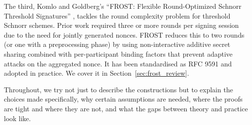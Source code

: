 The third, Komlo and Goldberg's ``FROST: Flexible Round-Optimized Schnorr Threshold
Signatures'' \cite{FROST20}, tackles the round complexity problem for threshold Schnorr
schemes. Prior work required three or more rounds per signing session due to the need
for jointly generated nonces. FROST reduces this to two rounds (or one with a
preprocessing phase) by using non-interactive additive secret sharing combined with
per-participant binding factors that prevent adaptive attacks on the aggregated nonce.
It has been standardised as RFC 9591 and adopted in practice. We cover it in
Section~\ref{sec:frost_review}.

Throughout, we try not just to describe the constructions but to explain the choices made
specifically, why certain assumptions are needed, where the proofs are tight and where
they are not, and what the gaps between theory and practice look like.